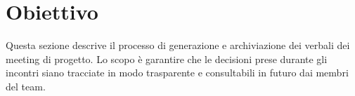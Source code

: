 \section{Obiettivo}

Questa sezione descrive il processo di generazione e archiviazione dei verbali dei meeting di progetto. Lo scopo è garantire che le decisioni prese durante gli incontri siano tracciate in modo trasparente e consultabili in futuro dai membri del team.
